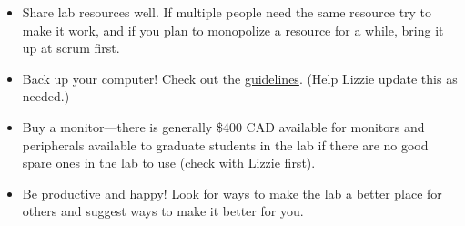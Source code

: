 \documentclass[11pt,a4paper,oneside]{article}
\begin{document}
\begin{itemize}
\item Share lab resources well. If multiple people need the same resource try to make it work, and if you plan to monopolize a resource for a while, bring it up at scrum first. 
\item Back up your computer! Check out the \href{https://github.com/temporalecologylab/labgit/blob/master/datacodemgmt/databackuplab.txt}{guidelines}. (Help Lizzie update this as needed.)
\item Buy a monitor---there is generally \$400 CAD available for monitors and peripherals available to graduate students in the lab if there are no good spare ones in the lab to use (check with Lizzie first). 
\item Be productive and happy! Look for ways to make the lab a better place for others and suggest ways to make it better for you. 
\end{itemize}

% 
\end{document}

